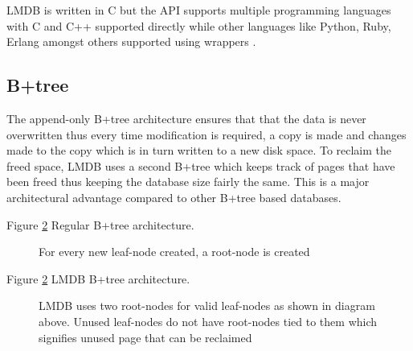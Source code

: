 \documentclass[9pt,twocolumn,twoside]{../../styles/osajnl}
\begin{document}
LMDB is written in C but the API supports multiple programming
languages with C and C++ supported directly while other languages like
Python, Ruby, Erlang amongst others supported using
wrappers \cite{www-lmdbwrap}.

\subsection{B+tree}

The append-only B+tree architecture ensures that that the data is
never overwritten thus every time modification is required, a copy is
made and changes made to the copy which is in turn written to a new
disk space. To reclaim the freed space, LMDB uses a second B+tree
which keeps track of pages that have been freed thus keeping the
database size fairly the same. This is a major architectural advantage
compared to other B+tree based databases.

Figure \ref{fig:false-color} Regular B+tree architecture.

\begin{figure}[htbp]
\centering
{}
\caption{For every new leaf-node created, a root-node is created}
\label{fig:false-color}
\end{figure}

Figure \ref{fig:false-color} LMDB B+tree architecture.

\begin{figure}[htbp]
\centering
{}
\caption{LMDB uses two root-nodes for valid leaf-nodes as shown in
  diagram above. Unused leaf-nodes do not have root-nodes tied to them
  which signifies unused page that can be reclaimed}
\label{fig:false-color}
\end{figure}
\end{document}
